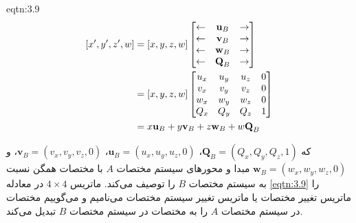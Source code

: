 {\begin{spacing}{1.6}
        \begin{eqtn}{eqtn:3.9}
            \begin{equation*}
                \centering
                \begin{split}
                [x^\prime,y^\prime,z^\prime,w]
                    &=[x,y,z,w]\begin{bmatrix}
                                   \leftarrow & \textbf{u}_{B} & \rightarrow \\
                                   \leftarrow & \textbf{v}_{B} & \rightarrow \\
                                   \leftarrow & \textbf{w}_{B} & \rightarrow \\
                                   \leftarrow & \textbf{Q}_{B} & \rightarrow
                    \end{bmatrix} \\
                    &=[x,y,z,w]\begin{bmatrix}
                                   u_{x} & u_{y} & u_{z} & 0 \\
                                   v_{x} & v_{y} & v_{z} & 0 \\
                                   w_{x} & w_{y} & w_{z} & 0 \\
                                   Q_{x} & Q_{y} & Q_{z} & 1
                    \end{bmatrix} \\
                    &=x\textbf{u}_{B}+y\textbf{v}_{B}+z\textbf{w}_{B}+w\textbf{Q}_{B}
                \end{split}
            \end{equation*}
            \centering
        \end{eqtn}

        که $\textbf{Q}_{B}=(Q_{x}, Q_{y}, Q_{z}, 1)$، $\textbf{u}_{B}=(u_{x}, u_{y}, u_{z}, 0)$، $\textbf{v}_{B}=(v_{x}, v_{y}, v_{z}, 0)$، و $\textbf{w}_{B}=(w_{x}, w_{y}, w_{z}, 0)$ مبدا و محورهای سیستم مختصات $A$ با مختصات همگن نسبت به سیستم مختصات $B$ را توصیف می‌کند.
        ماتریس $4\times 4$ در معادله \ref{eqtn:3.9} را ماتریس تغییر مختصات یا ماتریس تغییر سیستم مختصات می‌نامیم و می‌گوییم مختصات در سیستم مختصات $A$ را به مختصات در سیستم مختصات $B$ تبدیل می‌کند.
    \end{spacing}
}

